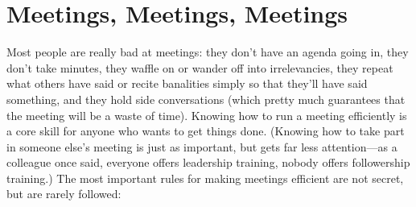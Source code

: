 \chapter{Meetings, Meetings, Meetings}\label{s:meetings}

Most people are really bad at meetings: they don't have an agenda
going in, they don't take minutes, they waffle on or wander off into
irrelevancies, they repeat what others have said or recite banalities
simply so that they'll have said something, and they hold side
conversations (which pretty much guarantees that the meeting will be a
waste of time).  Knowing how to run a meeting efficiently is a core
skill for anyone who wants to get things done. (Knowing how to take
part in someone else's meeting is just as important, but gets far less
attention---as a colleague once said, everyone offers leadership
training, nobody offers followership training.) The most important
rules for making meetings efficient are not secret, but are rarely
followed:

